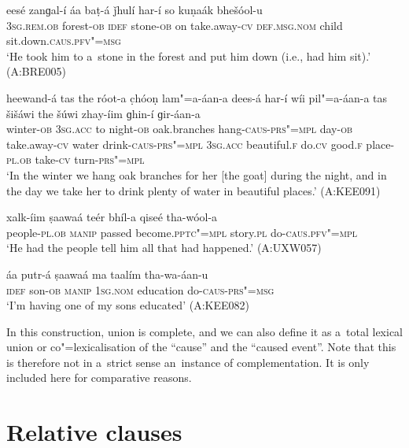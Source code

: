 \begin{exe}
\ex
\label{ex:13-184}
\gll eesé zanɡal-í áa baṭ-á ǰhulí har-í  so kuṇaák bhešóol-u \\
\textsc{3sg.rem.ob} forest-\textsc{ob} \textsc{idef} stone-\textsc{ob} on take.away-\textsc{cv} \textsc{def.msg.nom} child sit.down.\textsc{caus}.\textsc{pfv"=msg} \\
\glt `He took him to a~stone in the forest and put him down (i.e., had him sit).' (A:BRE005)

\ex
\label{ex:13-185}
\gll heewand-á tas the róot-a c̣hóoṇ  lam"=a-áan-a dees-á har-í wíi
pil"=a-áan-a tas šišáwi the šúwi zhay-íim  ɡhin-í ɡir-áan-a \\
winter-\textsc{ob}  \textsc{3sg.acc}  to night-\textsc{ob} oak.branches  hang-\textsc{caus}-\textsc{prs"=mpl} day-\textsc{ob} take.away-\textsc{cv} water  drink-\textsc{caus}-\textsc{prs"=mpl} \textsc{3sg.acc} beautiful.\textsc{f} do.\textsc{cv} good.\textsc{f} place-\textsc{pl.ob} take-\textsc{cv} turn-\textsc{prs"=mpl} \\
\glt `In the winter we hang oak branches for her [the goat] during the night, and in the day we take her to drink plenty of water in beautiful places.' (A:KEE091)

\ex
\label{ex:13-186}
\gll xalk-íim ṣaawaá teér bhíl-a qiseé  tha-wóol-a \\
people-\textsc{pl.ob} \textsc{manip} passed become.\textsc{pptc"=mpl} story.\textsc{pl} do-\textsc{caus}.\textsc{pfv"=mpl} \\
\glt `He had the people tell him all that had happened.' (A:UXW057)

\ex
\label{ex:13-187}
\gll áa putr-á ṣaawaá ma taalím tha-wa-áan-u  \\
\textsc{idef} son-\textsc{ob} \textsc{manip} \textsc{1sg.nom} education do-\textsc{caus}-\textsc{prs"=msg} \\
\glt `I'm having one of my sons educated' (A:KEE082) 
\end{exe}

In this construction,  union is complete, and we can also define it as a~total lexical union \citep[86]{noonan2007} or co"=lexicalisation of the ``cause'' and the ``caused event''. Note that this is therefore not in a~strict sense an~instance of complementation. It is only included here for comparative reasons.


\section{Relative clauses}
\label{sec:13-6}

